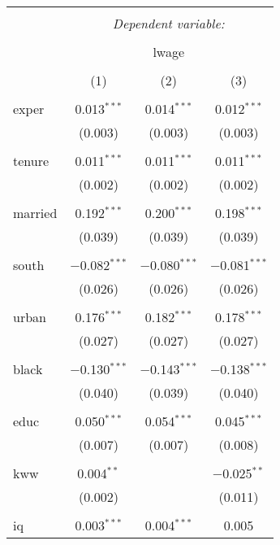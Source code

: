 \documentclass[11pt]{article} %
\begin{document}
  \begin{table}[!htbp] \centering 
	\caption{} 
	\label{4.11:partc} 
  \begin{tabular}{@{\extracolsep{5pt}}lccc} 
  \\[-1.8ex]\hline 
  \hline \\[-1.8ex] 
   & \multicolumn{3}{c}{\textit{Dependent variable:}} \\ 
  \cline{2-4} 
  \\[-1.8ex] & \multicolumn{3}{c}{lwage} \\ 
  \\[-1.8ex] & (1) & (2) & (3)\\ 
  \hline \\[-1.8ex] 
   exper & 0.013$^{***}$ & 0.014$^{***}$ & 0.012$^{***}$ \\ 
	& (0.003) & (0.003) & (0.003) \\ 
	& & & \\ 
   tenure & 0.011$^{***}$ & 0.011$^{***}$ & 0.011$^{***}$ \\ 
	& (0.002) & (0.002) & (0.002) \\ 
	& & & \\ 
   married & 0.192$^{***}$ & 0.200$^{***}$ & 0.198$^{***}$ \\ 
	& (0.039) & (0.039) & (0.039) \\ 
	& & & \\ 
   south & $-$0.082$^{***}$ & $-$0.080$^{***}$ & $-$0.081$^{***}$ \\ 
	& (0.026) & (0.026) & (0.026) \\ 
	& & & \\ 
   urban & 0.176$^{***}$ & 0.182$^{***}$ & 0.178$^{***}$ \\ 
	& (0.027) & (0.027) & (0.027) \\ 
	& & & \\ 
   black & $-$0.130$^{***}$ & $-$0.143$^{***}$ & $-$0.138$^{***}$ \\ 
	& (0.040) & (0.039) & (0.040) \\ 
	& & & \\ 
   educ & 0.050$^{***}$ & 0.054$^{***}$ & 0.045$^{***}$ \\ 
	& (0.007) & (0.007) & (0.008) \\ 
	& & & \\ 
   kww & 0.004$^{**}$ &  & $-$0.025$^{**}$ \\ 
	& (0.002) &  & (0.011) \\ 
	& & & \\ 
   iq & 0.003$^{***}$ & 0.004$^{***}$ & 0.005 \\ 

\end{tabular}
\end{table}
\end{document}
